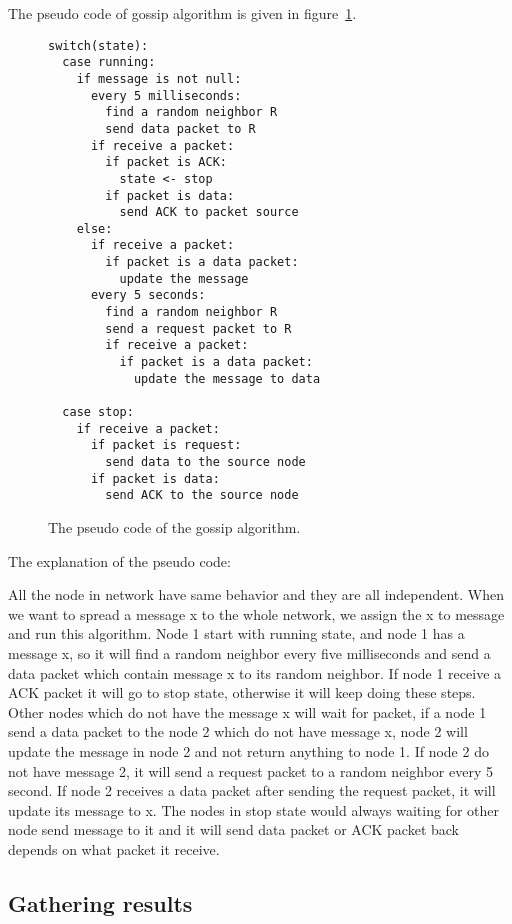 \documentclass[12pt,journal]{IEEEtran}
\begin{document}
The pseudo code of gossip algorithm is given in figure~\ref{fig:pseudo}.

\begin{figure}
 \centering
 \begin{Verbatim}[fontsize=\small]
switch(state):
  case running:
    if message is not null:
      every 5 milliseconds:
        find a random neighbor R
        send data packet to R
      if receive a packet:
        if packet is ACK:
          state <- stop
        if packet is data:
          send ACK to packet source
    else:
      if receive a packet:
        if packet is a data packet:
          update the message
      every 5 seconds:
        find a random neighbor R
        send a request packet to R
        if receive a packet:
          if packet is a data packet:
            update the message to data
                    
  case stop:
    if receive a packet:
      if packet is request:
        send data to the source node
      if packet is data:
        send ACK to the source node
\end{Verbatim}
 \caption{The pseudo code of the gossip algorithm.}
 \label{fig:pseudo}
\end{figure}

The explanation of the pseudo code: 

All the node in network have same behavior and they are all independent. When we want to spread a message x to the whole network, we assign the x to message and run this algorithm. Node 1 start with running state, and node 1 has a message x, so it will find a random neighbor every five milliseconds and send a data packet which contain message x to its random neighbor. If node 1 receive a ACK packet it will go to stop state, otherwise it will keep doing these steps. Other nodes which do not have the message x will wait for packet, if a node 1 send a data packet to the node 2 which do not have message x, node 2 will update the message in node 2 and not return anything to node 1. If node 2 do not have message 2, it will send a request packet to a random neighbor every 5 second. If node 2 receives a data packet after sending the request packet, it will update its message to x. The nodes in stop state would always waiting for other node send message to it and it will send data packet or ACK packet back depends on what packet it receive.

\subsection{Gathering results}
\end{document}
